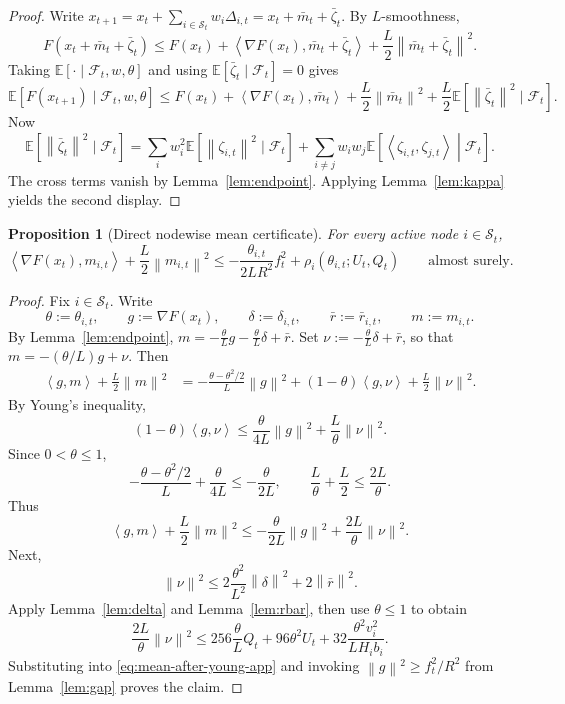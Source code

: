 \documentclass{article}
\newtheorem{proposition}[theorem]{Proposition}
\theoremstyle{definition}
\newcommand{\EE}{\mathbb E}
\newcommand{\cF}{\mathcal F}
\newcommand{\norm}[1]{\left\lVert #1\right\rVert}
\newcommand{\ip}[2]{\left\langle #1,#2\right\rangle}
\begin{document}
\begin{proof}
Write $
x_{t+1}
=
x_t+\sum_{i\in\mathcal S_t}w_i\Delta_{i,t}
=
x_t+\bar m_t+\bar \zeta_t$.
By $L$-smoothness,
\[
F(x_t+\bar m_t+\bar \zeta_t)
\le
F(x_t)
+
\ip{\nabla F(x_t)}{\bar m_t+\bar \zeta_t}
+
\frac{L}{2}\norm{\bar m_t+\bar \zeta_t}^2.
\]
Taking $\EE[\cdot\mid\cF_t,w,\theta]$ and using
$\EE[\bar \zeta_t\mid\cF_t]=0$ gives
\[
\EE[F(x_{t+1})\mid\cF_t,w,\theta]
\le
F(x_t)
+
\ip{\nabla F(x_t)}{\bar m_t}
+
\frac{L}{2}\norm{\bar m_t}^2
+
\frac{L}{2}\EE[\norm{\bar\zeta_t}^2\mid\cF_t].
\]
Now
\[
\EE[\norm{\bar\zeta_t}^2\mid\cF_t]
=
\sum_i w_i^2\EE[\norm{\zeta_{i,t}}^2\mid\cF_t]
+
\sum_{i\neq j}w_iw_j\EE\!\left[\ip{\zeta_{i,t}}{\zeta_{j,t}}\middle|\cF_t\right].
\]
The cross terms vanish by Lemma~\ref{lem:endpoint}. Applying
Lemma~\ref{lem:kappa} yields the second display.
\end{proof}

\begin{proposition}[Direct nodewise mean certificate]
\label{prop:mean}
For every active node $i\in\mathcal S_t$,
\[
\ip{\nabla F(x_t)}{m_{i,t}}
+
\frac{L}{2}\norm{m_{i,t}}^2
\le
-
\frac{\theta_{i,t}}{2LR^2}f_t^2
+
\rho_i(\theta_{i,t};U_t,Q_t)
\qquad\text{almost surely.}
\]
\end{proposition}

\begin{proof}
Fix $i\in\mathcal S_t$. Write
\[
\theta:=\theta_{i,t},
\qquad
g:=\nabla F(x_t),
\qquad
\delta:=\delta_{i,t},
\qquad
\bar r:=\bar r_{i,t},
\qquad
m:=m_{i,t}.
\]
By Lemma~\ref{lem:endpoint}, $
m=-\frac{\theta}{L}g-\frac{\theta}{L}\delta+\bar r$.
Set $
\nu:=-\frac{\theta}{L}\delta+\bar r$,
so that $m=-(\theta/L)g+\nu$. Then
\begin{align*}
\ip{g}{m}+\frac{L}{2}\norm{m}^2
&=
-\frac{\theta-\theta^2/2}{L}\norm{g}^2
+
(1-\theta)\ip{g}{\nu}
+
\frac{L}{2}\norm{\nu}^2.
\end{align*}
By Young's inequality,
\[
(1-\theta)\ip{g}{\nu}
\le
\frac{\theta}{4L}\norm{g}^2+\frac{L}{\theta}\norm{\nu}^2.
\]
Since $0<\theta\le 1$,
\[
-\frac{\theta-\theta^2/2}{L}+\frac{\theta}{4L}\le -\frac{\theta}{2L},
\qquad
\frac{L}{\theta}+\frac{L}{2}\le \frac{2L}{\theta}.
\]
Thus
\begin{equation}
\ip{g}{m}+\frac{L}{2}\norm{m}^2
\le
-\frac{\theta}{2L}\norm{g}^2
+
\frac{2L}{\theta}\norm{\nu}^2.
\label{eq:mean-after-young-app}\end{equation}
Next,
\[
\norm{\nu}^2
\le
2\frac{\theta^2}{L^2}\norm{\delta}^2+2\norm{\bar r}^2.
\]
Apply Lemma~\ref{lem:delta} and Lemma~\ref{lem:rbar}, then use
$\theta\le 1$ to obtain
\[
\frac{2L}{\theta}\norm{\nu}^2
\le
256\frac{\theta}{L}Q_t
+
96\theta^2 U_t
+
32\frac{\theta^2v_i^2}{L H_i b_i}.
\]
Substituting into \eqref{eq:mean-after-young-app} and invoking
$\norm{g}^2\ge f_t^2/R^2$ from Lemma~\ref{lem:gap} proves the claim.
\end{proof}
\end{document}
